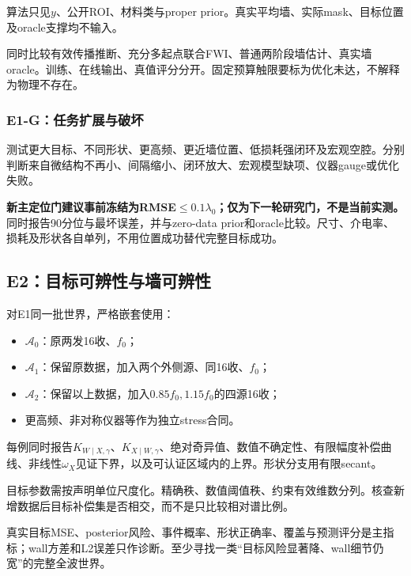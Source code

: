 \documentclass[
  10pt,
  a4paper,
]{article}
\providecommand{\tightlist}{%
  \setlength{\itemsep}{0pt}\setlength{\parskip}{0pt}}
\providecommand{\tightlist}{\setlength{\itemsep}{1pt}\setlength{\parskip}{1pt}}
\begin{document}
算法只见\(y\)、公开ROI、材料类与proper
prior。真实平均墙、实际mask、目标位置及oracle支撑均不输入。

同时比较有效传播推断、充分多起点联合FWI、普通两阶段墙估计、真实墙oracle。训练、在线输出、真值评分分开。固定预算触限要标为优化未达，不解释为物理不存在。

\hypertarget{e1-gux4efbux52a1ux6269ux5c55ux4e0eux7834ux574f}{%
\subsubsection{E1-G：任务扩展与破坏}\label{e1-gux4efbux52a1ux6269ux5c55ux4e0eux7834ux574f}}

测试更大目标、不同形状、更高频、更近墙位置、低损耗强闭环及宏观空腔。分别判断来自微结构不再小、间隔缩小、闭环放大、宏观模型缺项、仪器gauge或优化失败。

\textbf{新主定位门建议事前冻结为RMSE\(\le0.1\lambda_0\)；仅为下一轮研究门，不是当前实测。}
同时报告90分位与最坏误差，并与zero-data
prior和oracle比较。尺寸、介电率、损耗及形状各自单列，不用位置成功替代完整目标成功。

\hypertarget{e2ux76eeux6807ux53efux8fa8ux6027ux4e0eux5899ux53efux8fa8ux6027}{%
\subsection{E2：目标可辨性与墙可辨性}\label{e2ux76eeux6807ux53efux8fa8ux6027ux4e0eux5899ux53efux8fa8ux6027}}

对E1同一批世界，严格嵌套使用：

\begin{itemize}
\tightlist
\item
  \(\mathcal A_0\)：原两发16收、\(f_0\)；
\item
  \(\mathcal A_1\)：保留原数据，加入两个外侧源、同16收、\(f_0\)；
\item
  \(\mathcal A_2\)：保留以上数据，加入\(0.85f_0,1.15f_0\)的四源16收；
\item
  更高频、非对称仪器等作为独立stress合同。
\end{itemize}

每例同时报告\(K_{W\mid X,\gamma}\)、\(K_{X\mid W,\gamma}\)、绝对奇异值、数值不确定性、有限幅度补偿曲线、非线性\(\omega_X\)见证下界，以及可认证区域内的上界。形状分支用有限secant。

目标参数需按声明单位尺度化。精确秩、数值阈值秩、约束有效维数分列。核查新增数据后目标补偿集是否相交，而不是只比较相对谱比例。

真实目标MSE、posterior风险、事件概率、形状正确率、覆盖与预测评分是主指标；wall方差和L2误差只作诊断。至少寻找一类``目标风险显著降、wall细节仍宽''的完整全波世界。
\end{document}
